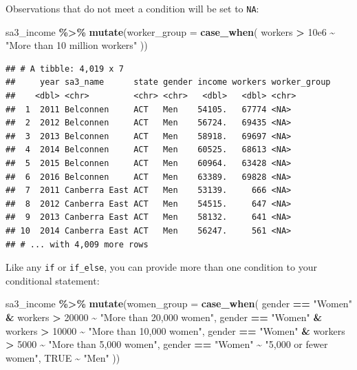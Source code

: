 \documentclass[
]{book}
\newenvironment{Shaded}{\begin{snugshade}}{\end{snugshade}}
\newcommand{\DataTypeTok}[1]{\textcolor[rgb]{0.13,0.29,0.53}{#1}}
\newcommand{\DecValTok}[1]{\textcolor[rgb]{0.00,0.00,0.81}{#1}}
\newcommand{\FloatTok}[1]{\textcolor[rgb]{0.00,0.00,0.81}{#1}}
\newcommand{\KeywordTok}[1]{\textcolor[rgb]{0.13,0.29,0.53}{\textbf{#1}}}
\newcommand{\NormalTok}[1]{#1}
\newcommand{\OperatorTok}[1]{\textcolor[rgb]{0.81,0.36,0.00}{\textbf{#1}}}
\newcommand{\OtherTok}[1]{\textcolor[rgb]{0.56,0.35,0.01}{#1}}
\newcommand{\StringTok}[1]{\textcolor[rgb]{0.31,0.60,0.02}{#1}}
\begin{document}
Observations that do not meet a condition will be set to \texttt{NA}:

\begin{Shaded}
\begin{Highlighting}[]
\NormalTok{sa3\_income }\OperatorTok{\%\textgreater{}\%}\StringTok{ }
\StringTok{  }\KeywordTok{mutate}\NormalTok{(}\DataTypeTok{worker\_group =} \KeywordTok{case\_when}\NormalTok{(}
\NormalTok{    workers }\OperatorTok{\textgreater{}}\StringTok{ }\FloatTok{10e6} \OperatorTok{\textasciitilde{}}\StringTok{ "More than 10 million workers"}
\NormalTok{  ))}
\end{Highlighting}
\end{Shaded}

\begin{verbatim}
## # A tibble: 4,019 x 7
##     year sa3_name      state gender income workers worker_group
##    <dbl> <chr>         <chr> <chr>   <dbl>   <dbl> <chr>       
##  1  2011 Belconnen     ACT   Men    54105.   67774 <NA>        
##  2  2012 Belconnen     ACT   Men    56724.   69435 <NA>        
##  3  2013 Belconnen     ACT   Men    58918.   69697 <NA>        
##  4  2014 Belconnen     ACT   Men    60525.   68613 <NA>        
##  5  2015 Belconnen     ACT   Men    60964.   63428 <NA>        
##  6  2016 Belconnen     ACT   Men    63389.   69828 <NA>        
##  7  2011 Canberra East ACT   Men    53139.     666 <NA>        
##  8  2012 Canberra East ACT   Men    54515.     647 <NA>        
##  9  2013 Canberra East ACT   Men    58132.     641 <NA>        
## 10  2014 Canberra East ACT   Men    56247.     561 <NA>        
## # ... with 4,009 more rows
\end{verbatim}

Like any \texttt{if} or \texttt{if\_else}, you can provide more than one condition to your conditional statement:

\begin{Shaded}
\begin{Highlighting}[]
\NormalTok{sa3\_income }\OperatorTok{\%\textgreater{}\%}\StringTok{ }
\StringTok{  }\KeywordTok{mutate}\NormalTok{(}\DataTypeTok{women\_group =} \KeywordTok{case\_when}\NormalTok{(}
\NormalTok{    gender }\OperatorTok{==}\StringTok{ "Women"} \OperatorTok{\&}\StringTok{ }\NormalTok{workers }\OperatorTok{\textgreater{}}\StringTok{ }\DecValTok{20000} \OperatorTok{\textasciitilde{}}\StringTok{ "More than 20,000 women"}\NormalTok{,}
\NormalTok{    gender }\OperatorTok{==}\StringTok{ "Women"} \OperatorTok{\&}\StringTok{ }\NormalTok{workers }\OperatorTok{\textgreater{}}\StringTok{ }\DecValTok{10000} \OperatorTok{\textasciitilde{}}\StringTok{ "More than 10,000 women"}\NormalTok{,}
\NormalTok{    gender }\OperatorTok{==}\StringTok{ "Women"} \OperatorTok{\&}\StringTok{ }\NormalTok{workers }\OperatorTok{\textgreater{}}\StringTok{  }\DecValTok{5000} \OperatorTok{\textasciitilde{}}\StringTok{ "More than 5,000 women"}\NormalTok{,}
\NormalTok{    gender }\OperatorTok{==}\StringTok{ "Women"}                  \OperatorTok{\textasciitilde{}}\StringTok{ "5,000 or fewer women"}\NormalTok{,}
    \OtherTok{TRUE} \OperatorTok{\textasciitilde{}}\StringTok{ "Men"}
\NormalTok{  ))}
\end{Highlighting}
\end{Shaded}
\end{document}

